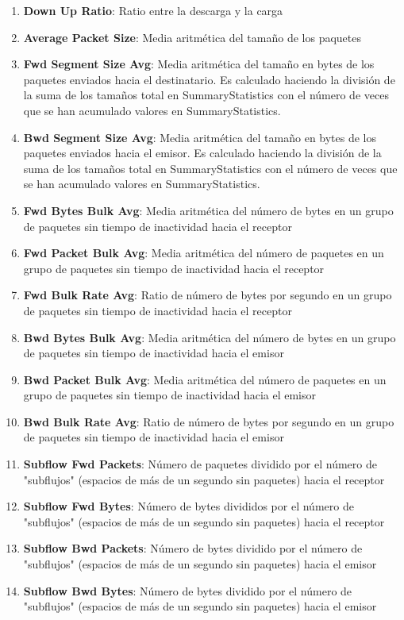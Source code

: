 \begin{enumerate}
    \item \textbf{Down Up Ratio}: Ratio entre la descarga y la carga
    \item \textbf{Average Packet Size}: Media aritmética del tamaño de los paquetes
    \item \textbf{Fwd Segment Size Avg}: Media aritmética del tamaño en bytes de los paquetes enviados hacia el destinatario. Es calculado haciendo la división de la suma de los tamaños total en SummaryStatistics con el número de veces que se han acumulado valores en SummaryStatistics.
    \item \textbf{Bwd Segment Size Avg}: Media aritmética del tamaño en bytes de los paquetes enviados hacia el emisor. Es calculado haciendo la división de la suma de los tamaños total en SummaryStatistics con el número de veces que se han acumulado valores en SummaryStatistics.
    \item \textbf{Fwd Bytes Bulk Avg}: Media aritmética del número de bytes en un grupo de paquetes sin tiempo de inactividad hacia el receptor
    \item \textbf{Fwd Packet Bulk Avg}: Media aritmética del número de paquetes en un grupo de paquetes sin tiempo de inactividad hacia el receptor
    \item \textbf{Fwd Bulk Rate Avg}: Ratio de número de bytes por segundo en un grupo de paquetes sin tiempo de inactividad hacia el receptor
    \item \textbf{Bwd Bytes Bulk Avg}: Media aritmética del número de bytes en un grupo de paquetes sin tiempo de inactividad hacia el emisor
    \item \textbf{Bwd Packet Bulk Avg}: Media aritmética del número de paquetes en un grupo de paquetes sin tiempo de inactividad hacia el emisor
    \item \textbf{Bwd Bulk Rate Avg}: Ratio de número de bytes por segundo en un grupo de paquetes sin tiempo de inactividad hacia el emisor
    \item \textbf{Subflow Fwd Packets}: Número de paquetes dividido por el número de "subflujos" (espacios de más de un segundo sin paquetes) hacia el receptor
    \item \textbf{Subflow Fwd Bytes}: Número de bytes divididos por el número de "subflujos" (espacios de más de un segundo sin paquetes) hacia el receptor
    \item \textbf{Subflow Bwd Packets}: Número de bytes dividido por el número de "subflujos" (espacios de más de un segundo sin paquetes) hacia el emisor
    \item \textbf{Subflow Bwd Bytes}: Número de bytes dividido por el número de "subflujos" (espacios de más de un segundo sin paquetes) hacia el emisor

\end{enumerate}

